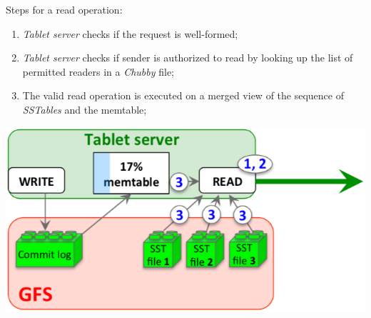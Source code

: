 \bigskip\noindent\begin{minipage}[c]{0.65\textwidth}
    Steps for a read operation:
    \begin{enumerate}
        \item \emph{Tablet server} checks if the request is well-formed;
        \item \emph{Tablet server} checks if sender is authorized to read by
        looking up the list of permitted readers in a \emph{Chubby} file;
        \item The valid read operation is executed on a merged view of the
        sequence of \emph{SSTables} and the memtable;
    \end{enumerate}
\end{minipage}\hfill
\begin{minipage}[c]{0.33\textwidth}
    \includegraphics[width=\textwidth]{images/gbt-tablet-read.png}
\end{minipage}

